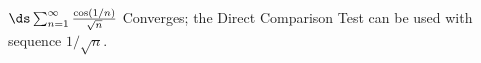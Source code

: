 {$\ds \sum_{n=1}^\infty \frac{\cos (1/n)}{\sqrt{n}}$
}
{Converges; the Direct Comparison Test can be used with sequence $1/\sqrt{n}$. 
}